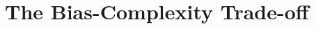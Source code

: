 \chapter{The Bias-Complexity Trade-off}

\begin{ex}
\end{ex}

\begin{ex}
\end{ex}

\begin{ex}
\end{ex}